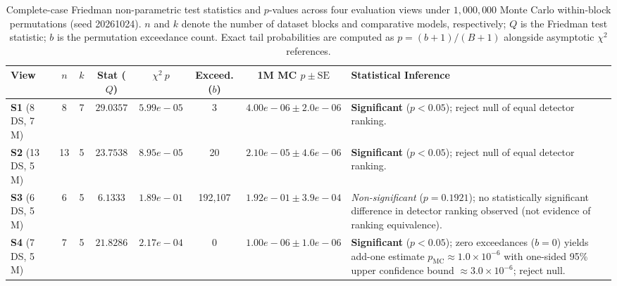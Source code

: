 \documentclass[applsci,article,submit,moreauthors,pdftex]{Definitions/mdpi}
\begin{document}
\begin{table}[htbp]
\centering\footnotesize\setlength{\tabcolsep}{2.5pt}
\caption{Complete-case Friedman non-parametric test statistics and $p$-values across four evaluation views under $1{,}000{,}000$ Monte Carlo within-block permutations (seed 20261024). $n$ and $k$ denote the number of dataset blocks and comparative models, respectively; $Q$ is the Friedman test statistic; $b$ is the permutation exceedance count. Exact tail probabilities are computed as $p = (b+1)/(B+1)$ alongside asymptotic $\chi^2$ references.}
\label{tab:friedman_stats}
\begin{tabularx}{\textwidth}{lcccccc>{\raggedright\arraybackslash}X}\toprule
\textbf{View} & \textbf{$n$} & \textbf{$k$} & \textbf{Stat ($Q$)} & $\chi^2\ p$ & \textbf{Exceed. ($b$)} & \textbf{1M MC $p \pm \text{SE}$} & \textbf{Statistical Inference} \\\midrule
\textbf{S1} (8 DS, 7 M) & 8 & 7 & $29.0357$ & $5.99e-05$ & 3 & $4.00e-06 \pm 2.0e-06$ & \textbf{Significant} ($p < 0.05$); reject null of equal detector ranking. \\
\textbf{S2} (13 DS, 5 M) & 13 & 5 & $23.7538$ & $8.95e-05$ & 20 & $2.10e-05 \pm 4.6e-06$ & \textbf{Significant} ($p < 0.05$); reject null of equal detector ranking. \\
\textbf{S3} (6 DS, 5 M) & 6 & 5 & $6.1333$ & $1.89e-01$ & 192,107 & $1.92e-01 \pm 3.9e-04$ & \textit{Non-significant} ($p = 0.1921$); no statistically significant difference in detector ranking observed (not evidence of ranking equivalence). \\
\textbf{S4} (7 DS, 5 M) & 7 & 5 & $21.8286$ & $2.17e-04$ & 0 & $1.00e-06 \pm 1.0e-06$ & \textbf{Significant} ($p < 0.05$); zero exceedances ($b=0$) yields add-one estimate $p_{\mathrm{MC}} \approx 1.0 \times 10^{-6}$ with one-sided 95\% upper confidence bound $\approx 3.0 \times 10^{-6}$; reject null. \\
\bottomrule
\end{tabularx}
\end{table}
\end{document}
